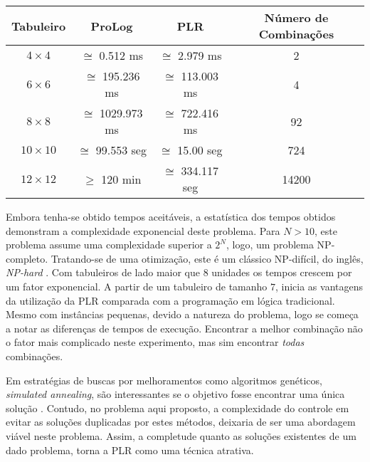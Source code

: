\documentclass[12pt]{article}
\theoremstyle{definition}
\begin{document}
\begin{center}
\begin{tabular}{c|c|c|c}
\hline
Tabuleiro & ProLog & PLR & Número de Combinações \\
\hline
\hline
$4 \times 4$ & $\cong$ 0.512 ms &  $\cong$ 2.979 ms & 2 \\
$6 \times 6$ & $\cong$ 195.236 ms & $\cong$ 113.003 ms & 4 \\
$8 \times 8$ &  $\cong$ 1029.973 ms & $\cong$ 722.416 ms & 92 \\
$10 \times 10$ & $\cong$ 99.553 seg & $\cong$ 15.00 seg & 724 \\
$12 \times 12$ & $\geq$ 120 min &  $\cong$ 334.117 seg & 14200 \\
\hline
\end{tabular}
\label{tab:Times}
\end{center}

Embora tenha-se obtido tempos aceitáveis, a estatística dos tempos obtidos demonstram a complexidade exponencial deste problema. Para $N > 10$, este problema assume uma complexidade superior a $2^N$, logo, um problema NP-completo. Tratando-se de uma otimização, este é um clássico NP-difícil, do inglês, {\em NP-hard} \cite{sipser_1996}. Com tabuleiros de lado maior que $8$ unidades os tempos crescem por um fator exponencial. A partir de um tabuleiro de tamanho $7$, inicia as vantagens da utilização da PLR comparada com a programação em lógica tradicional. Mesmo com instâncias pequenas, devido a natureza do problema, logo se começa a notar as diferenças de tempos de execução. Encontrar a melhor combinação não o fator mais complicado neste experimento, 
mas sim encontrar {\em todas} combinações. 

Em estratégias de buscas por melhoramentos como algoritmos genéticos, {\em simulated annealing}, são interessantes se o objetivo fosse encontrar uma única solução \cite{RusNorv}. Contudo, no problema aqui proposto,  a complexidade do controle em evitar as soluções duplicadas por estes métodos, deixaria de ser uma abordagem viável neste problema. Assim, a completude quanto as soluções
existentes de um dado problema, torna a PLR como uma técnica atrativa.
\end{document}
